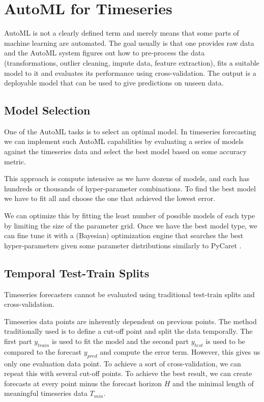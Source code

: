 \section{AutoML for Timeseries}

AutoML is not a clearly defined term and merely means that some parts of machine learning are automated. The goal usually is that one provides raw data and the AutoML system figures out how to pre-process the data (transformations, outlier cleaning, impute data, feature extraction), fits a suitable model to it and evaluates its performance using cross-validation. The output is a deployable model that can be used to give predictions on unseen data.

\subsection{Model Selection}

One of the AutoML tasks is to select an optimal model. In timeseries forecasting we can implement such AutoML capabilities by evaluating a series of models against the timeseries data and select the best model based on some accuracy metric.

This approach is compute intensive as we have dozens of models, and each has hundreds or thousands of hyper-parameter combinations. To find the best model we have to fit all and choose the one that achieved the lowest error.

We can optimize this by fitting the least number of possible models of each type by limiting the size of the parameter grid. Once we have the best model type, we can fine tune it with a (Bayesian) optimization engine that searches the best hyper-parameters given some parameter distributions similarly to PyCaret \cite{PyCaret}.

\subsection{Temporal Test-Train Splits}

Timeseries forecasters cannot be evaluated using traditional test-train splits and cross-validation.

Timeseries data points are inherently dependent on previous points. The method traditionally used is to define a cut-off point and split the data temporally. The first part \(y_{train}\) is used to fit the model and the second part \(y_{test}\) is used to be compared to the forecast \(y_{pred}\) and compute the error term. However, this gives us only one evaluation data point. To achieve a sort of cross-validation, we can repeat this with several cut-off points. To achieve the best result, we can create forecasts at every point minus the forecast horizon \(H\) and the minimal length of meaningful timeseries data \(T_{min}\). 

